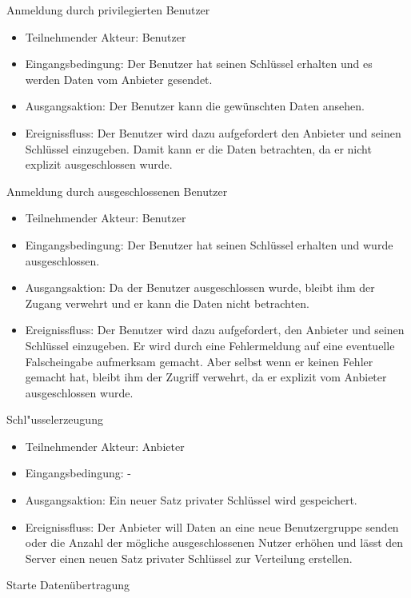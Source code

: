 \documentclass[a4paper,10pt]{scrartcl}
\begin{document}
\begin{usecase}
 {Anmeldung durch privilegierten Benutzer
   \begin{itemize}
   \item Teilnehmender Akteur: Benutzer
   \item Eingangsbedingung: Der Benutzer hat seinen Schlüssel erhalten und es werden Daten vom Anbieter
                            gesendet.
   \item Ausgangsaktion: Der Benutzer kann die gewünschten Daten ansehen.
   \item Ereignissfluss: Der Benutzer wird dazu aufgefordert den Anbieter und seinen Schlüssel
         einzugeben. Damit kann er die Daten betrachten, da er nicht explizit ausgeschlossen wurde.
   \end{itemize}
}
 {Anmeldung durch ausgeschlossenen Benutzer
   \begin{itemize}
   \item Teilnehmender Akteur: Benutzer
   \item Eingangsbedingung: Der Benutzer hat seinen Schlüssel erhalten und wurde ausgeschlossen.
   \item Ausgangsaktion:  Da der Benutzer ausgeschlossen wurde, bleibt ihm der Zugang verwehrt und er kann
             die Daten nicht betrachten.
   \item Ereignissfluss: Der Benutzer wird dazu aufgefordert, den Anbieter und seinen Schlüssel
         einzugeben. Er wird durch eine Fehlermeldung auf eine eventuelle Falscheingabe aufmerksam gemacht. Aber selbst wenn er keinen
         Fehler gemacht hat, bleibt ihm der Zugriff verwehrt, da er explizit vom Anbieter ausgeschlossen wurde.
   \end{itemize}
}
 {Schl"usselerzeugung
   \begin{itemize}
   \item Teilnehmender Akteur: Anbieter
   \item Eingangsbedingung: -
   \item Ausgangsaktion: Ein neuer Satz privater Schlüssel wird gespeichert.
   \item Ereignissfluss: Der Anbieter will Daten an eine neue Benutzergruppe senden oder die Anzahl der
         mögliche ausgeschlossenen Nutzer erhöhen und lässt
         den Server einen neuen Satz privater Schlüssel zur Verteilung erstellen.
   \end{itemize}
}
 {Starte Datenübertragung
   \begin{itemize}

\end{itemize}}
\end{usecase}
\end{document}
